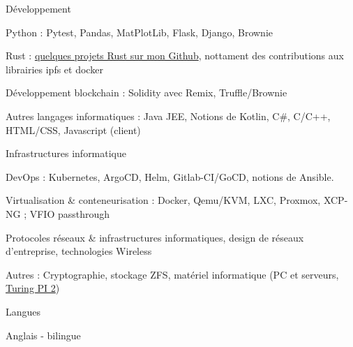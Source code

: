 \begin{cventries}
  \cventry
    {} %
    {Développement} %
    {} %
    {} %
    {
      \begin{cvitems} %
        \item {Python : Pytest, Pandas, MatPlotLib, Flask, Django, Brownie}
        \item {Rust : \href{https://github.com/guillheu?tab=repositories&q=&type=&language=rust&sort=}{quelques projets Rust sur mon Github}, nottament des contributions aux librairies ipfs et docker}
        \item {Développement blockchain : Solidity avec Remix, Truffle/Brownie}
        \item {Autres langages informatiques : Java JEE, Notions de Kotlin, C\#, C/C++, HTML/CSS, Javascript (client)}
      \end{cvitems}
    }
  \cventry
    {} %
    {Infrastructures informatique} %
    {} %
    {} %
    {
      \begin{cvitems} %
        \item {DevOps : Kubernetes, ArgoCD, Helm, Gitlab-CI/GoCD, notions de Ansible.}
        \item {Virtualisation \& conteneurisation : Docker, Qemu/KVM, LXC, Proxmox, XCP-NG ; VFIO passthrough}
        \item {Protocoles réseaux \& infrastructures informatiques, design de réseaux d'entreprise, technologies Wireless}
        \item {Autres : Cryptographie, stockage ZFS, matériel informatique (PC et serveurs, \href{https://turingpi.com/}{Turing PI 2})\\}
      \end{cvitems}
    }
  \cventry
    {} %
    {Langues} %
    {} %
    {} %
    {
      \begin{cvitems} %
        \item {Anglais - bilingue}
      \end{cvitems}
    }
\end{cventries}